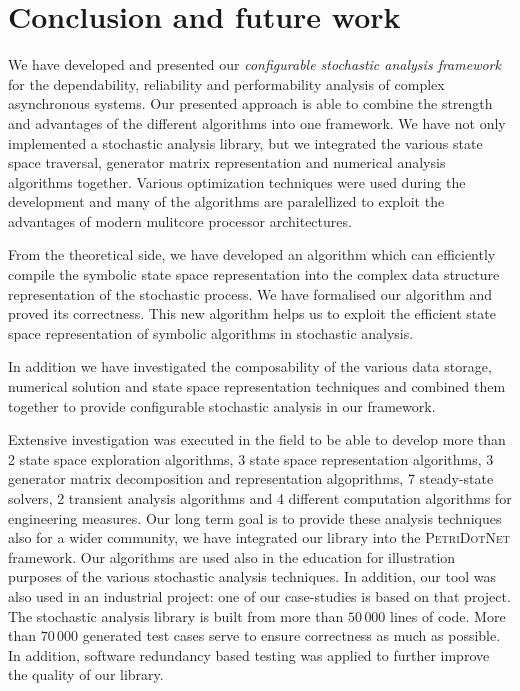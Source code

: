 \chapter{Conclusion and future work}
\label{chap:conclusion}

We have developed and presented our \emph{configurable stochastic
  analysis framework} for the dependability, reliability and
performability analysis of complex asynchronous systems.  Our
presented approach is able to combine the strength and advantages of
the different algorithms into one framework.  We have not only
implemented a stochastic analysis library, but we integrated the
various state space traversal, generator matrix representation and
numerical analysis algorithms together. Various optimization
techniques were used during the development and many of the algorithms
are paralellized to exploit the advantages of modern mulitcore
processor architectures.

From the theoretical side, we have developed an algorithm which can
efficiently compile the symbolic state space representation into the
complex data structure representation of the stochastic process. We
have formalised our algorithm and proved its correctness. 
This new algorithm helps us to exploit the efficient state space
representation of symbolic algorithms in stochastic analysis.

In addition
we have investigated the composability of the various data storage,
numerical solution and state space representation techniques and
combined them together to provide configurable stochastic analysis
in our framework.

Extensive investigation was executed in the field to be able to
develop more than 2 state space exploration algorithms, 3 state space
representation algorithms, 3 generator matrix decomposition and
representation algoprithms, 7 steady-state solvers, 2 transient
analysis algorithms and 4 different computation algorithms for
engineering measures.  Our long term goal is to provide these analysis
techniques also for a wider community, we have integrated our library
into the \textsc{PetriDotNet} framework. Our algorithms are used also
in the education for illustration purposes of the various stochastic
analysis techniques. In addition, our tool was also used in an
industrial project: one of our case-studies is based on that project.
The stochastic analysis library is built from more than $50\,000$
lines of code. More than $70\,000$ generated test cases serve to
ensure correctness as much as possible. In addition, software
redundancy based testing was applied to further improve the quality of
our library.

